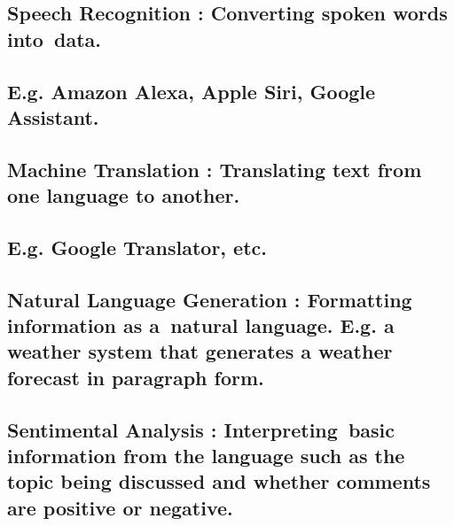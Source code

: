 \documentclass{article} %
\begin{document}
\noindent 
\subsection{}


\subsection{ Speech Recognition : Converting spoken words into~data.}

\noindent 
\subsection{E.g. Amazon Alexa, Apple Siri, Google Assistant.}

\noindent 
\subsection{}


\subsection{ Machine Translation : Translating text from one language to another.}

\noindent 
\subsection{E.g. Google Translator, etc.}

\noindent 
\subsection{ }


\subsection{ Natural Language Generation : Formatting information as a~natural language. E.g. a weather system that generates a weather forecast in paragraph form.}

\noindent 
\subsection{}


\subsection{ Sentimental Analysis :  Interpreting~basic information from the language such as the topic being discussed and whether comments are positive or negative. }
\end{document}
